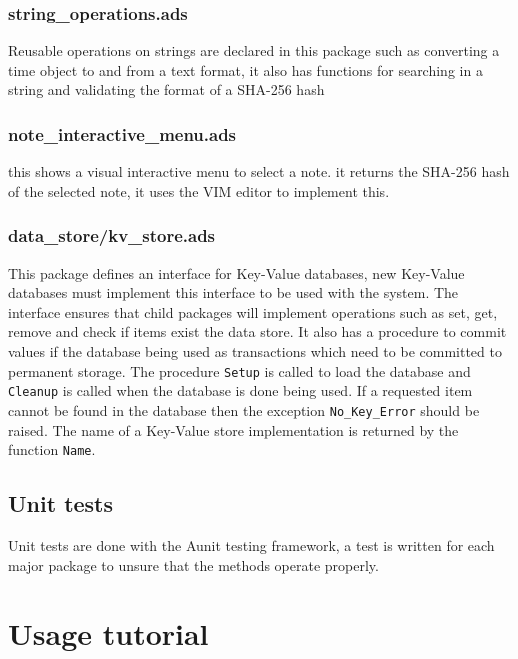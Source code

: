 \documentclass[12pt,a4paper]{article}
\newcommand{\codetext}[1]{\colorbox{light-gray}{\texttt{#1}}}
\begin{document}
\subsubsection{string\_operations.ads}
Reusable operations on strings are declared in this package such as converting a time object to and from a text format, it also has functions for searching in a string and validating the format of a SHA-256 hash

\subsubsection{note\_interactive\_menu.ads}
this shows a visual interactive menu to select a note. it returns the SHA-256 hash of the selected note, it uses the VIM editor to implement this.

\subsubsection{data\_store/kv\_store.ads}
This package defines an interface for Key-Value databases, new Key-Value databases must implement this interface to be used with the system. The interface ensures that child packages will implement operations such as set, get, remove and check if items exist the data store. It also has a procedure to commit values if the database being used as transactions which need to be committed to permanent storage. The procedure \codetext{Setup} is called to load the database and \codetext{Cleanup} is called when the database is done being used. If a requested item cannot be found in the database then the exception \codetext{No\_Key\_Error} should be raised. The name of a Key-Value store implementation is returned by the function \codetext{Name}.

\subsection{Unit tests}
Unit tests are done with the Aunit testing framework, a test is written for each major package to unsure that the methods operate properly.

\section{Usage tutorial}

%
\end{document}
